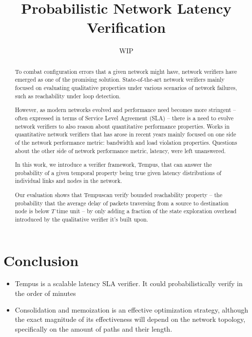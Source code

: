 \documentclass[10pt,sigconf,letterpaper,anonymous,nonacm]{acmart}
\title{Probabilistic Network Latency Verification}
\author{WIP}
\newcommand{\tool}[0]{Tempus}
\begin{document}
\begin{abstract}
    To combat configuration errors that a given network might have, network verifiers have emerged as 
    one of the promising solution. 
    State-of-the-art network verifiers mainly focused on evaluating qualitative properties under 
    various scenarios of network failures, such as reachability under loop detection. 
    
    However, as modern networks evolved and performance need becomes more stringent -- often 
    expressed in terms of Service Level Agreement (SLA) -- there is a need to evolve network 
    verifiers to also reason about quantitative performance properties. 
    Works in quantitative network verifiers that has arose in recent years mainly focused on one 
    side of the network performance metric: bandwidth and load violation properties. 
    Questions about the other side of network performance metric, latency, were left unanswered. 

    In this work, we introduce a verifier framework, Tempus, that can answer the probability of 
    a given temporal property being true given latency distributions of individual links and 
    nodes in the network. 
    
    Our evaluation shows that \tool can verify bounded reachability property -- the probability
    that the average delay of packets traversing from a source to destination node is below $T$
    time unit -- by only adding a fraction of the state exploration overhead introduced by the 
    qualitative verifier it's built upon.
\end{abstract}

\maketitle
















\section{Conclusion} \label{sec:conc}
\begin{itemize}
    \item Tempus is a scalable latency SLA verifier. It could probabilistically verify in the order of minutes
    \item Consolidation and memoization is an effective optimization strategy, although the exact magnitude of 
        its effectiveness will depend on the network topology, specifically on the amount of paths and their 
        length.
\end{itemize}



\end{document}
